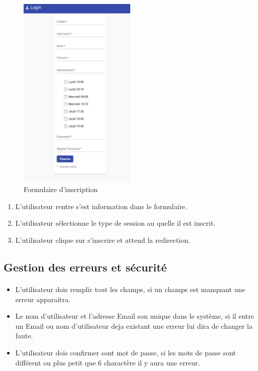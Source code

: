 \begin{figure}[h]
	\includegraphics[width=0.5\textwidth,center]{Mockup/Inscription}
	\caption{Formulaire d'inscription}
\end{figure}

\vspace{\baselineskip}
\begin{enumerate}
	\item L'utilisateur rentre s'est information dans le formulaire. 
	\item L'utilisateur sélectionne le type de session au quelle il est inscrit. 
	\item L'utilisateur clique sur s'inscrire et attend la redirection. 
\end{enumerate}

\subsection{Gestion des erreurs et sécurité}
	\paragraph{}
		\begin{itemize}
			\item L'utilisateur dois remplir tout les champs, si un champs est manquant une erreur apparaitra. 
			\item Le nom d'utilisateur et l'adresse Email son unique dans le système, si il entre un Email ou nom d'utilisateur deja existant une erreur lui dira de changer la faute.
			\item L'utilisateur dois confirmer sont mot de passe, si les mots de passe sont différent ou plus petit que 6 charactère il y aura une erreur.
		\end{itemize}
		
